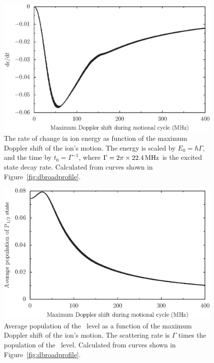 \begin{figure}[h!t]
\centering
\includegraphics{chapter7/heating/sample_dedt_v2}
\caption[Cooling rate versus maximum ion velocity]{The rate of change in ion energy as function of the maximum Doppler shift of the ion's motion. The energy is scaled by $E_0 = \hbar \Gamma$, and the time by $t_0 = \Gamma^{-1}$, where $\Gamma = 2\pi \times 22.4\,\mbox{MHz}$ is the excited state decay rate. Calculated from curves shown in Figure~\ref{fig:dbroadprofile}.}
\label{fig:dedt}
\end{figure} 

\begin{figure}[h!t]
\centering
\includegraphics{chapter7/heating/sample_population_v2}
\caption[Population of excited level versus maximum ion velocity]{Average population of the \poh\, level as a function of the maximum Doppler shift of the ion's motion. The scattering rate is $\Gamma$ times the population of the \poh\, level. Calculated from curves shown in Figure~\ref{fig:dbroadprofile}.}
\label{fig:populationdop}
\end{figure} 

